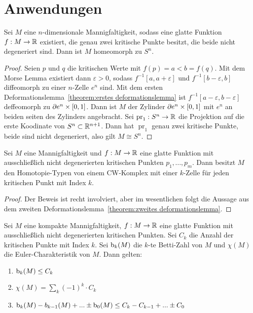 \section{Anwendungen}

\begin{theorem}
    \label{theorem:Sn}
    Sei $M$ eine $n$-dimensionale Mannigfaltigkeit, sodass eine glatte Funktion
    $f: M \to { \mathbb R }$ existiert, die genau zwei kritische Punkte besitzt, die beide
    nicht degeneriert sind. Dann ist $M$ homeomorph zu $S^n$.
\end{theorem}

\begin{proof}
    Seien $p$ und $q$ die kritischen Werte mit $f(p) = a < b = f(q)$. Mit dem 
    Morse Lemma existiert dann $\varepsilon > 0$, sodass 
    $f^{-1}[a, a + \varepsilon]$ und $f^{-1}[b - \varepsilon, b]$ diffeomorph
    zu einer $n$-Zelle $e^n$ sind. 
    Mit dem ersten Deformationslemma~\ref{theorem:erstes deformationslemma} ist
    $f^{-1}[a - \varepsilon, b - \varepsilon]$ deffeomorph zu 
    ${ \partial } e^n \times [0, 1]$. Dann ist $M$ der Zylinder ${ \partial } e^n \times [0, 1]$ 
    mit $e^n$ an beiden seiten des Zylinders angebracht. Sei 
    $\operatorname{pr}_1: S^n \to { \mathbb R }$ die Projektion auf die erste Koodinate von
    $S^n \subset { \mathbb R }^{n + 1}$. Dann hat $\operatorname{pr}_1$ genau zwei kritische 
    Punkte, beide sind nicht degeneriert, also gilt $M \cong S^n$.
\end{proof}

\begin{theorem}
    \label{theorem:CW-komplex}
    Sei $M$ eine Mannigfaltigkeit und $f: M \to { \mathbb R }$ eine glatte Funktion mit 
    ausschließlich nicht degenerierten kritischen Punkten $p_1, ..., p_m$. 
    Dann besitzt $M$ den Homotopie-Typen von einem CW-Komplex mit einer $k$-Zelle 
    für jeden kritischen Punkt mit Index $k$.
\end{theorem}

\begin{proof}
    Der Beweis ist recht involviert, aber im wesentlichen folgt die Aussage aus
    dem zweiten Deformationslemma~\ref{theorem:zweites deformationslemma}.
\end{proof}

\begin{theorem}
    Sei $M$ eine kompakte Mannigfaltigkeit, $f: M \to { \mathbb R }$ eine glatte Funktion
    mit ausschließlich nicht degenerierten kritischen Punkten. Sei $C_k$ die
    Anzahl der kritischen Punkte mit Index $k$. Sei ${ \operatorname{b} }_k(M)$ die $k$-te 
    Betti-Zahl von $M$ und $\chi(M)$ die Euler-Charakteristik von $M$. 
    Dann gelten:
    \begin{enumerate}
        \item $ { \operatorname{b} }_k(M) \leq C_k $ 
        \item $ \chi(M) = \sum_k (-1)^k \cdot C_k $
        \item $ { \operatorname{b} }_k(M) - b_{k - 1}(M) + ... \pm { \operatorname{b} }_0(M) 
            \leq C_k - C_{k-1} + ... \pm C_0 $
    \end{enumerate}
\end{theorem}

